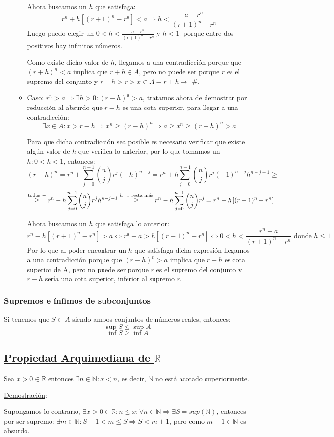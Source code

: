 \documentclass[10pt,a4paper,openright]{book}
\theoremstyle{break}
\begin{document}
\begin{enumerate}
\begin{itemize}
Ahora buscamos un $h$ que satisfaga:
$$r^n+h\left[(r+1)^n-r^n\right] <a \Rightarrow h<\frac{a-r^n}{(r+1)^n-r^n}$$
Luego puedo elegir un $0<h<\frac{a-r^n}{(r+1)^n-r^n}$ y $h<1$, porque entre dos positivos hay infinitos números.\par
Como existe dicho valor de $h$, llegamos a una contradicción porque que $(r+h)^n<a$ implica que $r+h\in A$, pero no puede ser porque $r$ es el supremo del conjunto y $r+h>r>x\in A=r+h\Rightarrow$ \#.
\vspace{0.5cm}
	\item Caso: $r^n>a\Rightarrow \exists h>0: (r-h)^n>a$, tratamos ahora de demostrar por reducción al absurdo que $r-h$ es una cota superior, para llegar a una contradicción:
$$\exists x\in A: x>r-h\Rightarrow x^n\geq (r-h)^n\Rightarrow a\geq x^n\geq (r-h)^n>a$$

Para que dicha contradicción sea posible es necesario verificar que existe algún valor de $h$ que verifica lo anterior, por lo que tomamos un $h: 0<h<1$, entonces:
$$(r-h)^n=r^n+\sum_{j=0}^{n-1}\binom{n}{j}r^j(-h)^{n-j}=r^n+h\sum_{j=0}^{n-1}\binom{n}{j}r^j(-1)^{n-j}h^{n-j-1}\geq $$
$$\stackrel{\mbox{\scriptsize{todos }}-}{\geq} r^n-h\sum_{j=0}^{n-1}\binom{n}{j}r^j h^{n-j-1}\stackrel{h=1\mbox{ \scriptsize{resta más}}}{\geq} r^n-h\sum_{j=0}^{n-1}\binom{n}{j}r^j=r^n-h\left[(r+1)^n-r^n\right]$$

Ahora buscamos un $h$ que satisfaga lo anterior:
$$r^n-h\left[(r+1)^n-r^n\right]>a\Leftrightarrow r^n-a>h\left[(r+1)^n-r^n\right]\Leftrightarrow 0<h<\frac{r^n-a}{(r+1)^n-r^n}\mbox{ donde } h\leq 1$$
Por lo que al poder encontrar un $h$ que satisfaga dicha expresión llegamos a una contradicción porque que $(r-h)^n>a$ implica que $r-h$ es cota superior de A, pero no puede ser porque $r$ es el supremo del conjunto y $r-h$ sería una cota superior, inferior al supremo $r$.
\end{itemize}
\end{enumerate}

\subsubsection{Supremos e ínfimos de subconjuntos}
Si tenemos que $S\subset A$ siendo ambos conjuntos de números reales, entonces:
$$\sup S\leq \sup A$$
$$\inf S\geq \inf A$$

\subsection{\underline{Propiedad Arquimediana de $\mathbb R$}}
Sea $x>0\in \mathbb R$ entonces $\exists n\in \mathbb N: x<n$, es decir, $\mathbb N$ no está acotado superiormente.\par
\underline{Demostración}:\par
Supongamos lo contrario, $\exists x>0\in \mathbb R: n\leq x: \forall n \in \mathbb N\Rightarrow \exists S=sup(\mathbb N)$, entonces por ser supremo: $\exists m \in \mathbb N : S-1<m\leq S\Rightarrow S<m+1$, pero como $m+1\in \mathbb N$ es absurdo.
\end{document}
